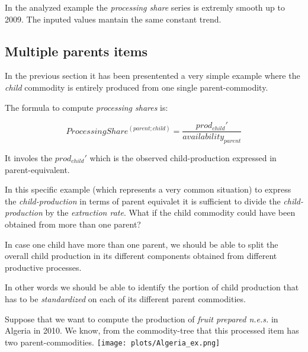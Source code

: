 \documentclass[nojss]{jss}
\begin{document}
In the analyzed example the \textit{processing share} series is extremly smooth up to 2009. The inputed values mantain the same constant trend.
  
  
  \subsection{Multiple parents items}
In the previous section it has been presentented a very simple example where the \textit{child} commodity is entirely produced from one single parent-commodity. 

The formula to compute \textit{processing shares} is:

 \begin{dmath*}
  ProcessingShare^{(parent;child)}=\frac{prod_{child}'}{availability_{parent}}
  \end{dmath*}
  
  It involes the $prod_{child}'$ which is the observed child-production expressed in parent-equivalent. 
  
  In this specific example (which represents a very common situation) to express the \textit{child-production} in terms of parent equivalet it is sufficient to divide the \textit{child-production} by the \textit{extraction rate}.
What if the child commodity could have been obtained from more than one parent?

In case one child have more than one parent, we should be able to split the overall child production in its different components obtained from different productive processes.
  
 In other words we should be able to identify the portion of child production that has to be \textit{standardized} on each of its different parent commodities.
  
  

Suppose that  we want to compute the production of \textit{fruit prepared n.e.s.} in Algeria in 2010. We know, from the commodity-tree that this   processed item has two parent-commodities.
%  
%  
%  
 \texttt{[image: plots/Algeria\_ex.png]}
  
\end{document}
